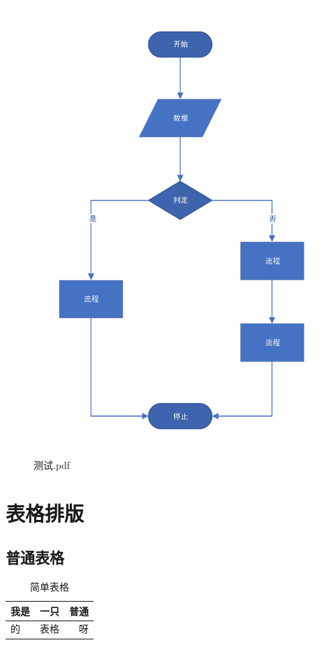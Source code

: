 \documentclass[fontset=windows]{ctexart}
\numberwithin{figure}{section}		%
\begin{document}
\begin{figure}[H]
\begin{minipage}[c]{0.5\textwidth}
		\includegraphics[width=1\textwidth]{测试.pdf}
		\caption{测试.pdf}
	\end{minipage}
\end{figure}

\section{表格排版}
\subsection{普通表格}
\begin{table}[H]
	\centering
	\caption{简单表格}
	\label{tab:1}
	\begin{tabular}{|l|c|r|}
		\hline
		我是 & 一只 & 普通 \\
		\hline
		的   & 表格 & 呀   \\
		\hline
	\end{tabular}
\end{table}
\end{document}
